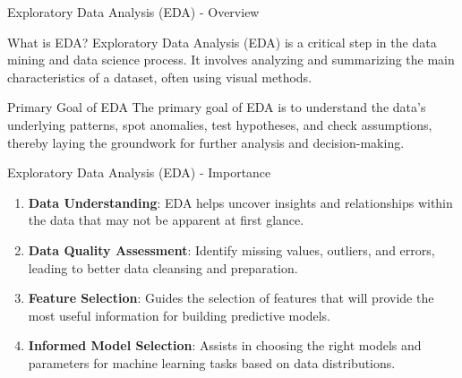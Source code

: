 \documentclass[aspectratio=169]{beamer}
\begin{document}
\begin{frame}[fragile]{Exploratory Data Analysis (EDA) - Overview}
    \begin{block}{What is EDA?}
        Exploratory Data Analysis (EDA) is a critical step in the data mining and data science process. It involves analyzing and summarizing the main characteristics of a dataset, often using visual methods. 
    \end{block}
    \begin{block}{Primary Goal of EDA}
        The primary goal of EDA is to understand the data's underlying patterns, spot anomalies, test hypotheses, and check assumptions, thereby laying the groundwork for further analysis and decision-making.
    \end{block}
\end{frame}

\begin{frame}[fragile]{Exploratory Data Analysis (EDA) - Importance}
    \begin{enumerate}
        \item \textbf{Data Understanding}: EDA helps uncover insights and relationships within the data that may not be apparent at first glance.
        \item \textbf{Data Quality Assessment}: Identify missing values, outliers, and errors, leading to better data cleansing and preparation.
        \item \textbf{Feature Selection}: Guides the selection of features that will provide the most useful information for building predictive models.
        \item \textbf{Informed Model Selection}: Assists in choosing the right models and parameters for machine learning tasks based on data distributions.
    \end{enumerate}
\end{frame}
\end{document}
